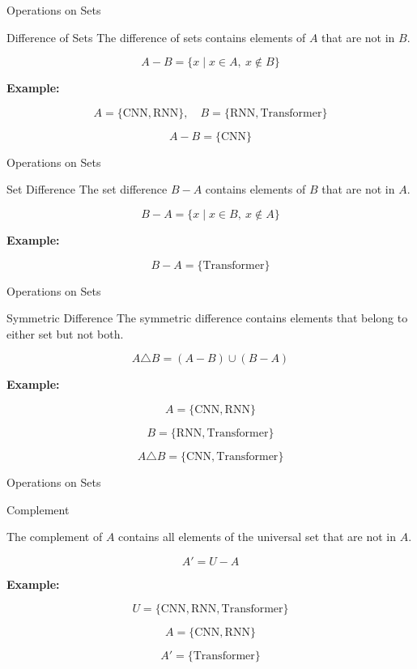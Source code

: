 \documentclass{beamer}
\begin{document}
\begin{frame}{Operations on Sets}
\begin{block}{Difference of Sets}
The difference of sets contains elements of $A$ that are not in $B$.
\end{block}
\[
A-B=\{x\mid x\in A,\ x\notin B\}
\]

\textbf{Example:}

\[
A=\{\text{CNN},\text{RNN}\},
\quad
B=\{\text{RNN},\text{Transformer}\}
\]

\[
A-B=\{\text{CNN}\}
\]

\end{frame}

\begin{frame}{Operations on Sets}
\begin{block}{Set Difference}
The set difference $B-A$ contains elements of $B$ that are not in $A$.
\end{block}
\[
B-A=\{x\mid x\in B,\ x\notin A\}
\]

\textbf{Example:}

\[
B-A=\{\text{Transformer}\}
\]

\end{frame}

\begin{frame}{Operations on Sets}
\begin{block}{Symmetric Difference}
The symmetric difference contains elements that belong to either set but not both.
\end{block}
\[
A\triangle B=(A-B)\cup(B-A)
\]

\textbf{Example:}

\[
A=\{\text{CNN},\text{RNN}\}
\]

\[
B=\{\text{RNN},\text{Transformer}\}
\]

\[
A\triangle B=
\{\text{CNN},\text{Transformer}\}
\]
\end{frame}

\begin{frame}{Operations on Sets}
\begin{block}{Complement}

The complement of $A$ contains all elements of the universal set that are not in $A$.
\end{block}
\[
A'=U-A
\]

\textbf{Example:}

\[
U=\{\text{CNN},\text{RNN},\text{Transformer}\}
\]

\[
A=\{\text{CNN},\text{RNN}\}
\]

\[
A'=\{\text{Transformer}\}
\]

\end{frame}
\end{document}
